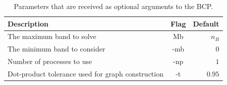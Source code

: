 \documentclass[a4paper,12pt]{report}
\begin{document}
\begin{appendices}
\begin{table}[H]
    \center
    \caption{Parameters that are received as optional arguments to the BCP.}\label{tab:options}
    \begin{tabular}{lcr}
        \hline
        Description & Flag & Default \\
        \hline
        The maximum band to solve  & Mb & $n_B$\\
        The minimum band to consider & -mb & $0$\\
        Number of processes to use & -np & $1$\\
        Dot-product tolerance used for graph construction & -t & $0.95$\\

        \hline
    \end{tabular}
\end{table}













\end{appendices}
\end{document}
